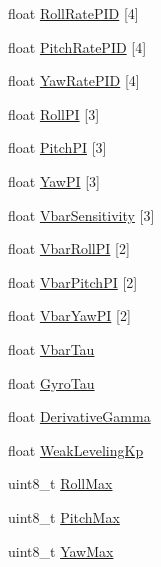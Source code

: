 \begin{DoxyCompactItemize}
\item 
float \hyperlink{struct____attribute_____af72fa6c8a98bb6f53c61bcf940acad9c}{\-Roll\-Rate\-P\-I\-D} \mbox{[}4\mbox{]}
\item 
float \hyperlink{struct____attribute_____a4a1866836affdf5713c3d03e3d2d71d9}{\-Pitch\-Rate\-P\-I\-D} \mbox{[}4\mbox{]}
\item 
float \hyperlink{struct____attribute_____a86e2aa908b8b9ccaa7748a6033da2a67}{\-Yaw\-Rate\-P\-I\-D} \mbox{[}4\mbox{]}
\item 
float \hyperlink{struct____attribute_____a22c27771c62e8eb2c4c6b7f0a91cc139}{\-Roll\-P\-I} \mbox{[}3\mbox{]}
\item 
float \hyperlink{struct____attribute_____aa2e2546893e7aa2bc3f1516f040ec199}{\-Pitch\-P\-I} \mbox{[}3\mbox{]}
\item 
float \hyperlink{struct____attribute_____a119faeca3be62c42089e3de95a3a9228}{\-Yaw\-P\-I} \mbox{[}3\mbox{]}
\item 
float \hyperlink{struct____attribute_____a5b6cb90c9975edb510ddcc9815ffb176}{\-Vbar\-Sensitivity} \mbox{[}3\mbox{]}
\item 
float \hyperlink{struct____attribute_____a3fc980e1a43b064b1466305752290391}{\-Vbar\-Roll\-P\-I} \mbox{[}2\mbox{]}
\item 
float \hyperlink{struct____attribute_____aa7f3567bc4df6b4a397bf5e0a8a86167}{\-Vbar\-Pitch\-P\-I} \mbox{[}2\mbox{]}
\item 
float \hyperlink{struct____attribute_____a6710592142d94562731332386434de96}{\-Vbar\-Yaw\-P\-I} \mbox{[}2\mbox{]}
\item 
float \hyperlink{struct____attribute_____a159dee9efc9ee57d4f21c00a743a0423}{\-Vbar\-Tau}
\item 
float \hyperlink{struct____attribute_____a815ad1283db7ded0e917804a4607a812}{\-Gyro\-Tau}
\item 
float \hyperlink{struct____attribute_____a4f6b4045cef3ca578c01222974678422}{\-Derivative\-Gamma}
\item 
float \hyperlink{struct____attribute_____a9fb67d0e7e3ab37116840bbfbf6a09e1}{\-Weak\-Leveling\-Kp}
\item 
uint8\-\_\-t \hyperlink{struct____attribute_____a81f61f01a70fcce57a1bc80206c01ac3}{\-Roll\-Max}
\item 
uint8\-\_\-t \hyperlink{struct____attribute_____aaf0599c6b7a11cf47c9681991f40b498}{\-Pitch\-Max}
\item 
uint8\-\_\-t \hyperlink{struct____attribute_____a2c9d35e2b1179bec9675a380651e573f}{\-Yaw\-Max}
\item 

\end{DoxyCompactItemize}
